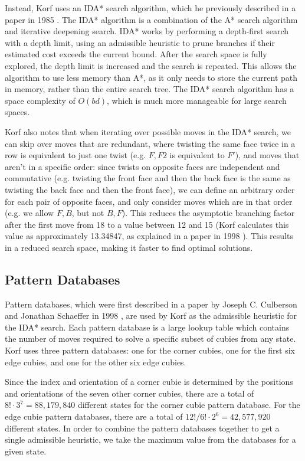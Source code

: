Instead, Korf uses an IDA* search algorithm, which he previously described in a paper in 1985 \cite{idastar}. The IDA* algorithm is a combination of the A* search algorithm and iterative deepening search. IDA* works by performing a depth-first search with a depth limit, using an admissible heuristic to prune branches if their estimated cost exceeds the current bound. After the search space is fully explored, the depth limit is increased and the search is repeated. This allows the algorithm to use less memory than A*, as it only needs to store the current path in memory, rather than the entire search tree. The IDA* search algorithm has a space complexity of $O(bd)$, which is much more manageable for large search spaces.

Korf also notes that when iterating over possible moves in the IDA* search, we can skip over moves that are redundant, where twisting the same face twice in a row is equivalent to just one twist (e.g. $F, F2$ is equivalent to $F'$), and moves that aren't in a specific order: since twists on opposite faces are independent and commutative (e.g. twisting the front face and then the back face is the same as twisting the back face and then the front face), we can define an arbitrary order for each pair of opposite faces, and only consider moves which are in that order (e.g. we allow $F, B$, but not $B, F$). This reduces the asymptotic branching factor after the first move from 18 to a value between 12 and 15 (Korf calculates this value as approximately 13.34847, as explained in a paper in 1998 \cite{branchingfactor}). This results in a reduced search space, making it faster to find optimal solutions.

\subsection{Pattern Databases}
Pattern databases, which were first described in a paper by Joseph C. Culberson and Jonathan Schaeffer in 1998 \cite{patterndatabases}, are used by Korf as the admissible heuristic for the IDA* search. Each pattern database is a large lookup table which contains the number of moves required to solve a specific subset of cubies from any state. Korf uses three pattern databases: one for the corner cubies, one for the first six edge cubies, and one for the other six edge cubies.

Since the index and orientation of a corner cubie is determined by the positions and orientations of the seven other corner cubies, there are a total of $8! \cdot 3^7 = 88,179,840$ different states for the corner cubie pattern database. For the edge cubie pattern databases, there are a total of $12! / 6! \cdot 2^6 = 42,577,920$ different states. In order to combine the pattern databases together to get a single admissible heuristic, we take the maximum value from the databases for a given state.

